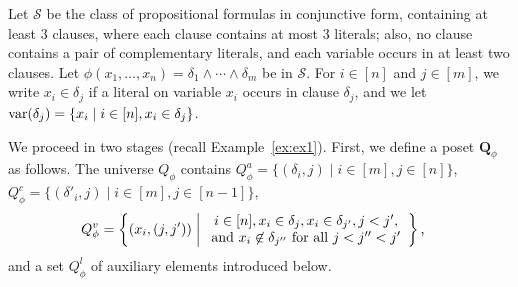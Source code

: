 \documentclass[usletter]{article}
\newcommand{\longversion}[1]{#1}
\newcommand{\shortversion}[1]{}
\newcommand{\longshort}[2]{\longversion{#1}\shortversion{#2}}
\newcommand{\qq}{\mathbf{Q}}
\newcommand{\suchthat}{\;\ifnum\currentgrouptype=16 \middle\fi|\;}
\begin{document}
\longversion{\figpphib}


Let $\mathcal{S}$ be the class of propositional formulas in conjunctive form, containing at least $3$ clauses, 
where each clause contains at most $3$ literals; 
also, no clause contains a pair of complementary literals, 
and each variable occurs in at least two clauses.  
Let $\phi(x_1,\ldots,x_n)=\delta_1 \wedge \cdots \wedge \delta_m$ be in $\mathcal{S}$.  
For $i \in [n]$ and $j \in [m]$, we write $x_i \in \delta_j$ if a literal on variable $x_i$ occurs in clause $\delta_j$, 
and we let $\textup{var}(\delta_j)=\{ x_i \mid i \in [n], x_i \in \delta_j \}$.   

\longshort{We proceed in two stages (recall Example~\ref{ex:ex1}). }{We proceed in two stages.}
First, we define a poset $\qq_{\phi}$ as follows.  
The universe $Q_{\phi}$ contains 
$Q_{\phi}^a = \{ (\delta_i,j) \mid i \in [m], j \in [n]\}$, 
$Q_{\phi}^c = \{ (\delta'_i,j) \mid i \in [m], j \in [n-1]\}$, 
\begin{align*}
Q_{\phi}^v &=\left\{ (x_i,(j,j')) \suchthat 
\begin{array}{c}
i \in [n], x_i \in \delta_j, x_i \in \delta_{j'},j<j'\textup{,}\\
\textup{and } x_i \not\in \delta_{j''} \textup{ for all } j<j''<j'
\end{array} \right\}\text{,}
\end{align*}
and a set $Q_{\phi}^l$ of auxiliary elements introduced below. 
\end{document}
